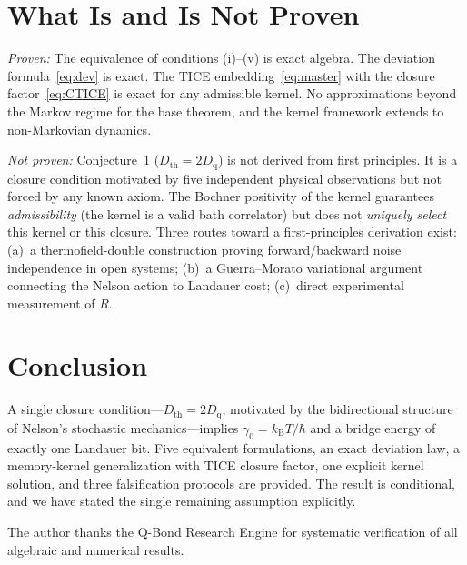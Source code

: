 \documentclass[twocolumn,showpacs,preprintnumbers,amsmath,amssymb]{revtex4-2}
\newcommand{\kB}{k_{\mathrm{B}}}
\newcommand{\Dth}{D_{\mathrm{th}}}
\newcommand{\Dq}{D_{\mathrm{q}}}
\begin{document}
\section{What Is and Is Not Proven}

\textit{Proven:}
The equivalence of conditions (i)--(v) is exact algebra.
The deviation formula~\eqref{eq:dev} is exact.
The TICE embedding~\eqref{eq:master} with the closure
factor~\eqref{eq:CTICE} is exact for any admissible kernel.
No approximations beyond the Markov regime for the base
theorem, and the kernel framework extends to non-Markovian
dynamics.

\textit{Not proven:}
Conjecture~1 ($\Dth = 2\Dq$) is not derived from first
principles.  It is a closure condition motivated by five
independent physical observations but not forced by any
known axiom.
The Bochner positivity of the kernel guarantees
\emph{admissibility} (the kernel is a valid bath correlator)
but does not \emph{uniquely select} this kernel or this
closure.
Three routes toward a first-principles derivation exist:
(a)~a thermofield-double construction proving forward/backward
noise independence in open systems;
(b)~a Guerra--Morato variational argument~\cite{GuerraMorato1983}
connecting the Nelson action to Landauer cost;
(c)~direct experimental measurement of $R$.

\section{Conclusion}

A single closure condition---$\Dth = 2\Dq$, motivated by the
bidirectional structure of Nelson's stochastic mechanics---implies
$\gamma_0 = \kB T/\hbar$ and a bridge energy of exactly one
Landauer bit.  Five equivalent formulations, an exact deviation
law, a memory-kernel generalization with TICE closure factor, one
explicit kernel solution, and three falsification protocols are
provided.  The result is conditional, and we have stated the
single remaining assumption explicitly.

\begin{acknowledgments}
The author thanks the Q-Bond Research Engine for systematic
verification of all algebraic and numerical results.
\end{acknowledgments}
\end{document}
